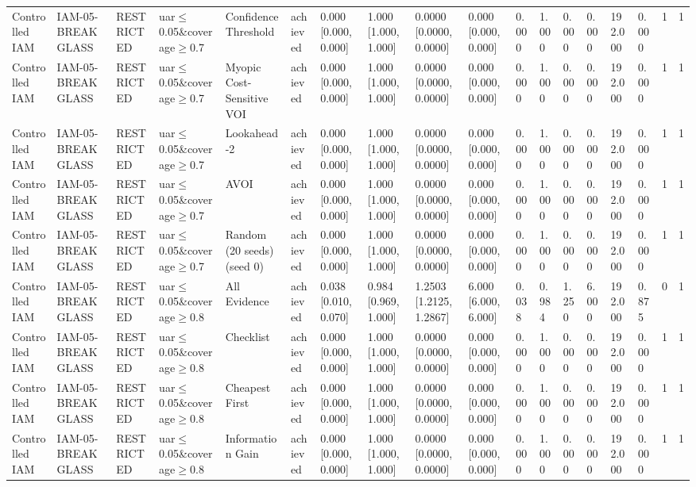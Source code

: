 \begin{table}[!ht]
{\begin{tabular}{llllllllllllllllll}
Controlled IAM & IAM-05-BREAKGLASS & RESTRICTED & uar$\le$0.05\&coverage$\ge$0.7 & Confidence Threshold & achieved & 0.000 [0.000, 0.000] & 1.000 [1.000, 1.000] & 0.0000 [0.0000, 0.0000] & 0.000 [0.000, 0.000] & 0.000 & 1.000 & 0.000 & 0.000 & 192.000 & 0.000 & 1 & 1 \\
Controlled IAM & IAM-05-BREAKGLASS & RESTRICTED & uar$\le$0.05\&coverage$\ge$0.7 & Myopic Cost-Sensitive VOI & achieved & 0.000 [0.000, 0.000] & 1.000 [1.000, 1.000] & 0.0000 [0.0000, 0.0000] & 0.000 [0.000, 0.000] & 0.000 & 1.000 & 0.000 & 0.000 & 192.000 & 0.000 & 1 & 1 \\
Controlled IAM & IAM-05-BREAKGLASS & RESTRICTED & uar$\le$0.05\&coverage$\ge$0.7 & Lookahead-2 & achieved & 0.000 [0.000, 0.000] & 1.000 [1.000, 1.000] & 0.0000 [0.0000, 0.0000] & 0.000 [0.000, 0.000] & 0.000 & 1.000 & 0.000 & 0.000 & 192.000 & 0.000 & 1 & 1 \\
Controlled IAM & IAM-05-BREAKGLASS & RESTRICTED & uar$\le$0.05\&coverage$\ge$0.7 & AVOI & achieved & 0.000 [0.000, 0.000] & 1.000 [1.000, 1.000] & 0.0000 [0.0000, 0.0000] & 0.000 [0.000, 0.000] & 0.000 & 1.000 & 0.000 & 0.000 & 192.000 & 0.000 & 1 & 1 \\
Controlled IAM & IAM-05-BREAKGLASS & RESTRICTED & uar$\le$0.05\&coverage$\ge$0.7 & Random (20 seeds) (seed 0) & achieved & 0.000 [0.000, 0.000] & 1.000 [1.000, 1.000] & 0.0000 [0.0000, 0.0000] & 0.000 [0.000, 0.000] & 0.000 & 1.000 & 0.000 & 0.000 & 192.000 & 0.000 & 1 & 1 \\
Controlled IAM & IAM-05-BREAKGLASS & RESTRICTED & uar$\le$0.05\&coverage$\ge$0.8 & All Evidence & achieved & 0.038 [0.010, 0.070] & 0.984 [0.969, 1.000] & 1.2503 [1.2125, 1.2867] & 6.000 [6.000, 6.000] & 0.038 & 0.984 & 1.250 & 6.000 & 192.000 & 0.875 & 0 & 1 \\
Controlled IAM & IAM-05-BREAKGLASS & RESTRICTED & uar$\le$0.05\&coverage$\ge$0.8 & Checklist & achieved & 0.000 [0.000, 0.000] & 1.000 [1.000, 1.000] & 0.0000 [0.0000, 0.0000] & 0.000 [0.000, 0.000] & 0.000 & 1.000 & 0.000 & 0.000 & 192.000 & 0.000 & 1 & 1 \\
Controlled IAM & IAM-05-BREAKGLASS & RESTRICTED & uar$\le$0.05\&coverage$\ge$0.8 & Cheapest First & achieved & 0.000 [0.000, 0.000] & 1.000 [1.000, 1.000] & 0.0000 [0.0000, 0.0000] & 0.000 [0.000, 0.000] & 0.000 & 1.000 & 0.000 & 0.000 & 192.000 & 0.000 & 1 & 1 \\
Controlled IAM & IAM-05-BREAKGLASS & RESTRICTED & uar$\le$0.05\&coverage$\ge$0.8 & Information Gain & achieved & 0.000 [0.000, 0.000] & 1.000 [1.000, 1.000] & 0.0000 [0.0000, 0.0000] & 0.000 [0.000, 0.000] & 0.000 & 1.000 & 0.000 & 0.000 & 192.000 & 0.000 & 1 & 1 \\

\end{tabular}}
\end{table}
